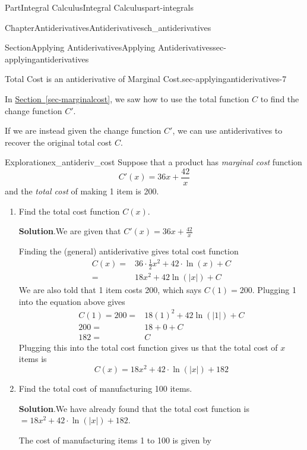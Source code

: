 \documentclass[oneside,10pt,]{tufte-book}
\newcommand{\blocktitlefont}{\relax}
\newcommand{\xreffont}{\relax}
\numberwithin{equation}{chapter}
\newcommand{\amp}{&}
\begin{document}
\begin{partptx}{Part}{Integral Calculus}{}{Integral Calculus}{}{}{part-integrals}
\begin{chapterptx}{Chapter}{Antiderivatives}{}{Antiderivatives}{}{}{ch_antiderivatives}
\begin{sectionptx}{Section}{Applying Antiderivatives}{}{Applying Antiderivatives}{}{}{sec-applyingantiderivatives}
\begin{paragraphs}{Total Cost is an antiderivative of Marginal Cost.}{sec-applyingantiderivatives-7}
\par
In \hyperref[sec-marginalcost]{Section~{\xreffont\ref{sec-marginalcost}}}, we saw how to use the total function \(C\) to find the change function \(C'\).%
\par
If we are instead given the change function \(C'\), we can use antiderivatives to recover the original total cost \(C\).%
\end{paragraphs}%
\begin{exploration}{Exploration}{}{ex_antideriv_cost}%
Suppose that a product has \emph{marginal cost} function%
\begin{equation*}
C'(x) = 36x + \frac{42}{x}
\end{equation*}
and the \emph{total cost} of making 1 item is \textdollar{}200.%
\begin{enumerate}[font=\bfseries,label=(\alph*),ref=\alph*]%
\item{}Find the total cost function \(C(x)\).%
\par\smallskip%
\noindent\textbf{\blocktitlefont Solution}.\hypertarget{ex_antideriv_cost-2-2}{}\quad{}We are given that \(C'(x) = 36x + \frac{42}{x} \)%
\par
Finding the (general) antiderivative gives total cost function%
\begin{align*}
C(x) = \amp 36\cdot \frac{1}{2}x^2 + 42\cdot \ln(x) + C\\
= \amp 18 x^2 + 42\ln(|x|) + C
\end{align*}
We are also told that 1 item costs \textdollar{}200, which says \(C(1) = 200\).  Plugging 1 into the equation above gives%
\begin{align*}
C(1) = 200 = \amp 18(1)^2 + 42\ln(|1|) + C \\
200 = \amp 18 + 0 + C \\
182 = \amp C 
\end{align*}
Plugging this into the total cost function gives us that the total cost of \(x\) items is%
\begin{equation*}
C(x) = 18x^2 + 42\cdot \ln(|x|) + 182
\end{equation*}
%
\item{}Find the total cost of manufacturing 100 items.%
\par\smallskip%
\noindent\textbf{\blocktitlefont Solution}.\hypertarget{ex_antideriv_cost-3-2}{}\quad{}We have already found that the total cost function is \(= 18x^2 + 42\cdot \ln(|x|) + 182\).%
\par
The cost of manufacturing items 1 to 100 is given by%
\begin{equation*}

\end{equation*}
\end{enumerate}
\end{exploration}
\end{sectionptx}
\end{chapterptx}
\end{partptx}
\end{document}
